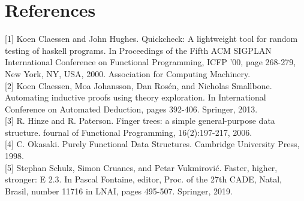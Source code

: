 \documentclass[10pt]{article}
\begin{document}
\section*{References}
[1] Koen Claessen and John Hughes. Quickcheck: A lightweight tool for random testing of haskell programs. In Proceedings of the Fifth ACM SIGPLAN International Conference on Functional Programming, ICFP '00, page 268-279, New York, NY, USA, 2000. Association for Computing Machinery.\\[0pt]
[2] Koen Claessen, Moa Johansson, Dan Rosén, and Nicholas Smallbone. Automating inductive proofs using theory exploration. In International Conference on Automated Deduction, pages 392-406. Springer, 2013.\\[0pt]
[3] R. Hinze and R. Paterson. Finger trees: a simple general-purpose data structure. fournal of Functional Programming, 16(2):197-217, 2006.\\[0pt]
[4] C. Okasaki. Purely Functional Data Structures. Cambridge University Press, 1998.\\[0pt]
[5] Stephan Schulz, Simon Cruanes, and Petar Vukmirović. Faster, higher, stronger: E 2.3. In Pascal Fontaine, editor, Proc. of the 27th CADE, Natal, Brasil, number 11716 in LNAI, pages 495-507. Springer, 2019.
\end{document}
